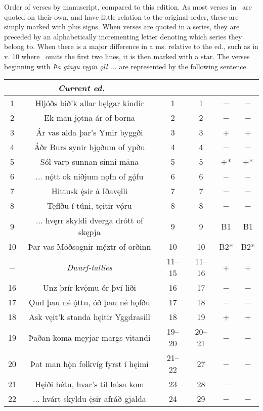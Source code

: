 Order of verses by manuscript, compared to this edition. As most verses in \GylfMS\ are quoted on their own, and have little relation to the original order, these are simply marked with plus signs. When verses are quoted in a series, they are preceded by an alphabetically incrementing letter denoting which series they belong to. When there is a major difference in a ms. relative to the ed., such as in v. 10 where \GylfMS\ omits the first two lines, it is then marked with a star. The verses beginning with \emph{Þȧ gingu ręgin ǫll ...} are represented by the following sentence.
\begin{longtable}{|c c c c c c|}
	\hline
	\multicolumn{2}{|c}{\emph{Current ed.}} & \Regius & \Hauksbok & \RegiusProse\Trajectinus\Wormianus & \Upsaliensis \\ [0.5ex]
	\hline\hline
	1 & Hljóðs bið’k allar hęlgar kindir & 1 & 1 & − & − \\
	2 & Ek man jǫtna ár of borna & 2 & 2 & − & − \\
	3 & Ár vas alda þar’s Ymir byggði & 3 & 3 & + & + \\
	4 & Áðr Burs synir bjǫðum of ypðu & 4 & 4 & − & − \\
	5 & Sól varp sunnan sinni mȧna & 5 & 5 & +* & +* \\
	6 & ... nǫ́tt ok niðjum nǫfn of gǫ́fu & 6 & 6 & − & − \\
	7 & Hittusk ę̇sir ȧ Iðavęlli & 7 & 7 & − & − \\
	8 & Tęflðu í túni, tęitir vǫ́ru & 8 & 8 & − & − \\
	9 & ... hvęrr skyldi dverga drótt of skępja & 9 & 9 & B1 & B1 \\
	10 & Þar vas Móðsognir mę́ztr of orðinn & 10 & 10 & B2* & B2* \\
	− & \emph{Dwarf-tallies} & 11–15 & 11–16 & + & + \\
	16 & Unz þrír kvǫ̇mu ór því liði & 16 & 17 & − & − \\
	17 & Ǫnd þau né ǫ́ttu, óð þau né hǫfðu & 17 & 18 & − & − \\
	18 & Ask vęit’k standa hęitir Yggdrasill & 18 & 19 & + & + \\
	19 & Þaðan koma męyjar margs vitandi & 19–20 & 20–21 & − & − \\
	20 & Þat man hǫ̇n folkvíg fyrst í hęimi & 21–22 & 27 & − & − \\
	21 & Hęiði hétu, hvar’s til húsa kom & 23 & 28 & − & − \\
	22 & ... hvárt skyldu ę̇sir afráð gjalda & 24 & 29 & − & − \\

\end{longtable}
